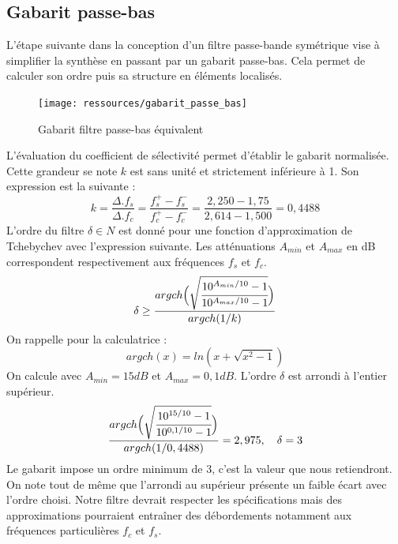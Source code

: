 \documentclass[french]{article}
\begin{document}
\subsection{Gabarit passe-bas}
L'étape suivante dans la conception d'un filtre passe-bande symétrique vise à simplifier la synthèse en passant par un gabarit passe-bas. Cela permet de calculer son ordre puis sa structure en éléments localisés.
\begin{figure}[H]
	\centering
	\texttt{[image: ressources/gabarit\_passe\_bas]}
	\caption{Gabarit filtre passe-bas équivalent}
	\label{fig:gabaritpassepas}
\end{figure}
L'évaluation du coefficient de sélectivité permet d'établir le gabarit normalisée. Cette grandeur se note $k$ est sans unité et strictement inférieure à 1. Son expression est la suivante :
\begin{equation}
	k=\frac{\Delta.f_s}{\Delta.f_c}=\frac{f_s^+-f_s^-}{f_c^+-f_c^-}=\frac{2,250-1,75}{2,614-1,500}=0,4488
\end{equation}
L'ordre du filtre $\delta \in N$ est donné pour une fonction d'approximation de Tchebychev avec l'expression suivante. Les atténuations $A_{min}$ et $A_{max}$ en dB correspondent respectivement aux fréquences $f_s$ et $f_c$.
\begin{equation}
\delta \geq \frac{argch
	\Big( \sqrt{\cfrac{10^{A_{min}/10}-1}{10^{A_{max}/10}-1}}
	\Big)
}{argch(1/k)}
\end{equation}
On rappelle pour la calculatrice :
\begin{equation}
argch(x)=ln(x+\sqrt{x^2-1})
\end{equation}
On calcule avec $A_{min} = 15dB$ et $A_{max} = 0,1dB$. L'ordre $\delta$ est arrondi à l'entier supérieur.
\begin{equation}
\frac{argch
	\Big( \sqrt{\cfrac{10^{15/10}-1}{10^{0,1/10}-1}}
	\Big)
}{argch(1/0,4488)} = 2,975, \quad \delta = 3
\end{equation}
Le gabarit impose un ordre minimum de 3, c'est la valeur que nous retiendront. On note tout de même que l'arrondi au supérieur présente un faible écart avec l'ordre choisi. Notre filtre devrait respecter les spécifications mais des approximations pourraient entraîner des débordements notamment aux fréquences particulières $f_c$ et $f_s$.
\end{document}
